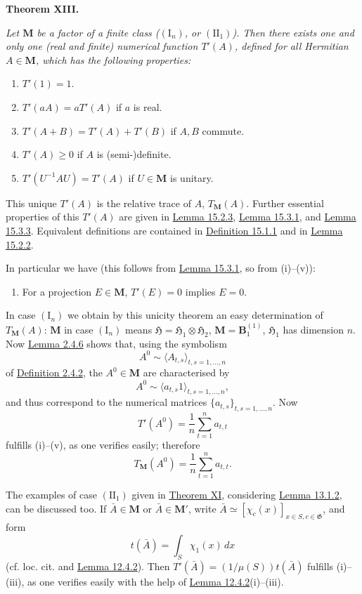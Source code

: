 \documentclass[12pt,b5paper,twoside]{article}
\newcommand{\Hspace}{\mathfrak H}
\newcommand{\M}{\mathbf M}
\newcommand{\B}{\mathbf B}
\newcommand{\MainTheorem}[1]{%
  \par\smallskip\noindent\phantomsection\label{thm:#1}\textbf{Theorem #1.}\enspace
}
\newcommand{\defref}[1]{\hyperref[def:#1]{Definition #1}}
\newcommand{\lemref}[1]{\hyperref[lem:#1]{Lemma #1}}
\newcommand{\thmref}[1]{\hyperref[thm:#1]{Theorem #1}}
\begin{document}
\MainTheorem{XIII}
{\itshape Let \(\M\) be a factor of a finite class
(\((\mathrm I_n)\), or \((\mathrm{II}_1)\)). Then there exists one and only
one (real and finite) numerical function \(T'(A)\), defined for all Hermitian
\(A\in\M\), which has the following properties:
\begin{enumerate}[label=(\roman*)]
\item \(T'(1)=1\).
\item \(T'(aA)=aT'(A)\) if \(a\) is real.
\item \(T'(A+B)=T'(A)+T'(B)\) if \(A,B\) commute.
\item \(T'(A)\geq0\) if \(A\) is (semi-)definite.
\item \(T'(U^{-1}AU)=T'(A)\) if \(U\in\M\) is unitary.
\end{enumerate}
This unique \(T'(A)\) is the relative trace of \(A\), \(T_{\M}(A)\).
Further essential properties of this \(T'(A)\) are given in
\lemref{15.2.3}, \lemref{15.3.1}, and \lemref{15.3.3}. Equivalent
definitions are contained in \defref{15.1.1} and in \lemref{15.2.2}.

In particular we have (this follows from \lemref{15.3.1}, so from (i)--(v)):
\begin{enumerate}[label=(\roman*),start=6]
\item For a projection \(E\in\M\), \(T'(E)=0\) implies \(E=0\).
\end{enumerate}}

In case \((\mathrm I_n)\) we obtain by this unicity theorem an easy
determination of \(T_{\M}(A)\): \(\M\) in case \((\mathrm I_n)\) means
\(\Hspace=\Hspace_1\otimes\Hspace_2\), \(\M=\B_1^{(1)}\),
\(\Hspace_1\) has dimension \(n\). Now \lemref{2.4.6} shows that, using the
symbolism
\[
A^0\sim\langle A_{t,s}\rangle_{t,s=1,\ldots,n}
\]
of \defref{2.4.2}, the \(A^0\in\M\) are characterised by
\[
A^0\sim\langle a_{t,s}1\rangle_{t,s=1,\ldots,n},
\]
and thus correspond to the numerical matrices
\(\{a_{t,s}\}_{t,s=1,\ldots,n}\). Now
\[
T'(A^0)=\frac1n\sum_{t=1}^na_{t,t}
\]
fulfills (i)--(v), as one verifies easily; therefore
\[
T_{\M}(A^0)=\frac1n\sum_{t=1}^na_{t,t}.
\]

The examples of case \((\mathrm{II}_1)\) given in \thmref{XI}, considering
\lemref{13.1.2}, can be discussed too. If \(\bar A\in\M\) or
\(\bar A\in\M'\), write
\(\bar A\simeq[\chi_c(x)]_{x\in S,c\in\mathfrak G}\), and form
\[
t(\bar A)=\int_S\chi_1(x)\,dx
\]
(cf. loc. cit. and \lemref{12.4.2}). Then
\(T'(\bar A)=(1/\mu(S))t(\bar A)\) fulfills (i)--(iii), as one verifies
easily with the help of \lemref{12.4.2}(i)--(iii).
\end{document}
